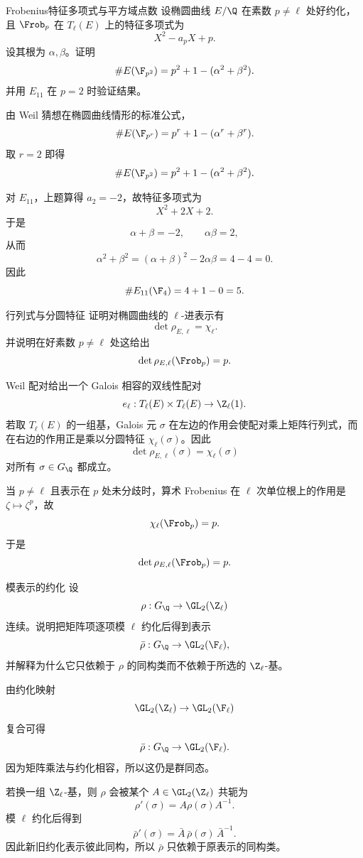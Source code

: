 \begin{problem}{Frobenius特征多项式与平方域点数}
\easy
设椭圆曲线 $E/\Q$ 在素数 $p\neq \ell$ 处好约化，且 $\Frob_p$ 在 $T_\ell(E)$ 上的特征多项式为
\[
X^2-a_pX+p.
\]
设其根为 $\alpha,\beta$。证明
\[
\#E(\F_{p^2})=p^2+1-(\alpha^2+\beta^2).
\]
并用 $E_{11}$ 在 $p=2$ 时验证结果。
\end{problem}
\begin{solution}
由 Weil 猜想在椭圆曲线情形的标准公式，
\[
\#E(\F_{p^r})=p^r+1-(\alpha^r+\beta^r).
\]
取 $r=2$ 即得
\[
\#E(\F_{p^2})=p^2+1-(\alpha^2+\beta^2).
\]

对 $E_{11}$，上题算得 $a_2=-2$，故特征多项式为
\[
X^2+2X+2.
\]
于是
\[
\alpha+\beta=-2,
\qquad
\alpha\beta=2,
\]
从而
\[
\alpha^2+\beta^2=(\alpha+\beta)^2-2\alpha\beta=4-4=0.
\]
因此
\[
\#E_{11}(\F_4)=4+1-0=5.
\]
\end{solution}

\begin{problem}{行列式与分圆特征}
\easy
证明对椭圆曲线的 $\ell$-进表示有
\[
\det\rho_{E,\ell}=\chi_\ell.
\]
并说明在好素数 $p\neq\ell$ 处这给出
\[
\det\rho_{E,\ell}(\Frob_p)=p.
\]
\end{problem}
\begin{solution}
Weil 配对给出一个 Galois 相容的双线性配对
\[
e_\ell:T_\ell(E)\times T_\ell(E)\to\Z_\ell(1).
\]
若取 $T_\ell(E)$ 的一组基，Galois 元 $\sigma$ 在左边的作用会使配对乘上矩阵行列式，而在右边的作用正是乘以分圆特征 $\chi_\ell(\sigma)$。因此
\[
\det\rho_{E,\ell}(\sigma)=\chi_\ell(\sigma)
\]
对所有 $\sigma\in G_\Q$ 都成立。

当 $p\neq\ell$ 且表示在 $p$ 处未分歧时，算术 Frobenius 在 $\ell$ 次单位根上的作用是 $\zeta\mapsto\zeta^p$，故
\[
\chi_\ell(\Frob_p)=p.
\]
于是
\[
\det\rho_{E,\ell}(\Frob_p)=p.
\]
\end{solution}

\begin{problem}{模表示的约化}
\easy
设
\[
\rho:G_\Q\to\GL_2(\Z_\ell)
\]
连续。说明把矩阵项逐项模 $\ell$ 约化后得到表示
\[
\bar\rho:G_\Q\to\GL_2(\F_\ell),
\]
并解释为什么它只依赖于 $\rho$ 的同构类而不依赖于所选的 $\Z_\ell$-基。
\end{problem}
\begin{solution}
由约化映射
\[
\GL_2(\Z_\ell)\to\GL_2(\F_\ell)
\]
复合可得
\[
\bar\rho:G_\Q\to\GL_2(\F_\ell).
\]
因为矩阵乘法与约化相容，所以这仍是群同态。

若换一组 $\Z_\ell$-基，则 $\rho$ 会被某个 $A\in\GL_2(\Z_\ell)$ 共轭为
\[
\rho'(\sigma)=A\rho(\sigma)A^{-1}.
\]
模 $\ell$ 约化后得到
\[
\bar\rho'(\sigma)=\bar A\,\bar\rho(\sigma)\,\bar A^{-1}.
\]
因此新旧约化表示彼此同构，所以 $\bar\rho$ 只依赖于原表示的同构类。
\end{solution}

